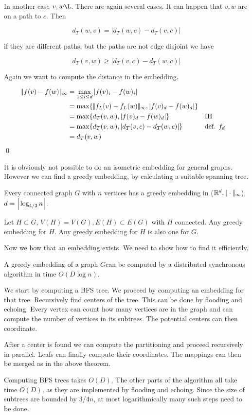 \begin{pr}
In another case $v,w\L$. There are again several cases. It can happen that $v,w$ are on a path to $c$. Then

\[d_T(w,v) = | d_T(w,c)-d_T(v,c)|\]

if they are different paths, but the paths are not edge disjoint we have

\[d_T(v,w) \geq |d_T(v,c) - d_T(w,c)|\] 

Again we want to compute the distance in the embedding.

\begin{align*}
|\!|f(v)-f(w)|\!|_\infty &= \max_{1\leq i\leq d} |f(v)_i-f(w)_i|\\
	&=\max \{	|\!|f_L(v)-f_L(w)|\!|_\infty, |f(v)_d-f(w)_d|\}\\
	&=\max\{ d_T(v,w), |f(v)_d-f(w)_d|\} && \text{IH}\\
	&=\max\{ d_T(v,w), |d_T(v,c)-d_T(w,c)|\} && \text{def. $f_d$}\\
	&= d_T(v,w)
\end{align*}
\hfill\qed
\end{pr}

It is obviously not possible to do an isometric embedding for general graphs. However we can find a greedy embedding, by calculating a suitable spanning tree.

\begin{thm} Every connected graph $G$ with $n$ vertices has a greedy embedding in ($\mathbb{R}^d,|\!|\cdot|\!|_{\infty}$), $d=\left\lceil \log_{4/3}n \right\rceil$.
\end{thm}

\begin{pr}
Let $H\subset G$, $V(H) = V(G), E(H) \subset E(G)$ with $H$ connected. Any greedy embedding for $H$. Any greedy embedding for $H$ is also one for $G$. 
\end{pr}

Now we how that an embedding exists. We need to show how to find it efficiently.

\begin{thm} A greedy embedding of a graph $G$can be computed by a distributed synchronous algorithm in time $O(D\log n)$.\end{thm}

\begin{pr}[Sketch.] We start by computing a BFS tree. We proceed by computing an embedding for that tree. Recursively find centers of the tree. This can be done by flooding and echoing. Every vertex can count how many vertices are in the graph and can compute the number of vertices in its subtrees. The potential centers can then coordinate. 

After a center is found we can compute the partitioning and proceed recursively in parallel. Leafs can finally compute their coordinates. The mappings can then be merged as in the above theorem.

Computing BFS trees takes $O(D)$. The other parts of the algorithm all take time $O(D)$, as they are implemented by flooding and echoing. Since the size of subtrees are bounded by $3/4n$, at most logarithmically many such steps need to be done.
\end{pr}

